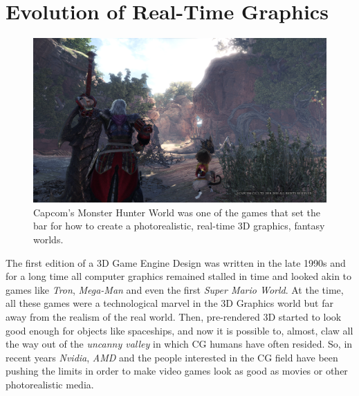 \documentclass[10pt,journal,compsoc]{IEEEtran}
\begin{document}


\section{Evolution of Real-Time Graphics}\label{sec:1}

\begin{figure}[H] 
    \centering
    \includegraphics[scale=0.17]{img/mhw2.png}
    \caption{Capcom's Monster Hunter World was one of the games that set the bar for how to create a photorealistic, real-time 3D graphics, fantasy worlds.}
    \label{fig:mhw}
\end{figure}

\par The first edition of a 3D Game Engine Design was written in the late 1990s\cite{david} and for a long time all computer graphics remained stalled in time and looked akin to games like \textit{Tron}, \textit{Mega-Man} and even the first\textit{ Super Mario World}. At the time, all these games were a technological marvel in the 3D Graphics world but far away from the realism of the real world. Then, pre-rendered 3D started to look good enough for objects like spaceships, and now it is possible to, almost, claw all the way out of the \textit{uncanny valley} in which CG humans have often resided. So, in recent years \textit{Nvidia}, \textit{AMD} and the people interested in the CG field have been pushing the limits in order to make video games look as good as movies or other photorealistic media.
\end{document}
